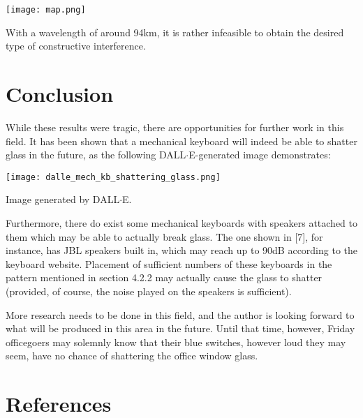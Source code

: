 \documentclass{article}
\begin{document}
\begin{multicols}{2}
\begin{center}
\texttt{[image: map.png]} \end{center} \begin{center}\small With a wavelength of around 94km, it is rather infeasible to obtain the desired type of constructive interference. \end{center}

\section{Conclusion}

While these results were tragic, there are opportunities for further work in this field. It has been shown that a mechanical keyboard will indeed be able to shatter glass in the future, as the following DALL$\cdot$E-generated image demonstrates:

\begin{center}
\texttt{[image: dalle\_mech\_kb\_shattering\_glass.png]} \end{center} \begin{center}\small Image generated by DALL$\cdot$E. \end{center}

Furthermore, there do exist some mechanical keyboards with speakers attached to them which may be able to actually break glass. The one shown in [7], for instance, has JBL speakers built in, which may reach up to 90dB according to the keyboard website. Placement of sufficient numbers of these keyboards in the pattern mentioned in section 4.2.2 may actually cause the glass to shatter (provided, of course, the noise played on the speakers is sufficient).

More research needs to be done in this field, and the author is looking forward to what will be produced in this area in the future. Until that time, however, Friday officegoers may solemnly know that their blue switches, however loud they may seem, have no chance of shattering the office window glass.

\end{multicols}

\section{References}
\end{document}
